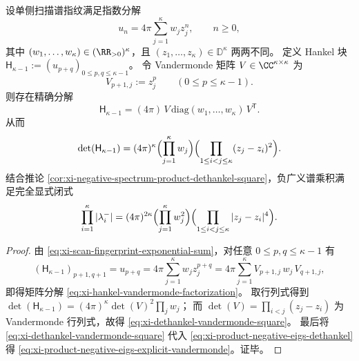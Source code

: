 \begin{theorem}\label{thm:xi-dethankel-vandermonde-square-finite-blaschke}
设单侧扫描谱指纹满足指数分解
\begin{equation}\label{eq:xi-scan-fingerprint-exponential-sum}
u_n=4\pi\sum_{j=1}^{\kappa} w_j z_j^{n},\qquad n\ge 0,
\end{equation}
其中 \((w_1,\dots,w_\kappa)\in(\RR_{>0})^\kappa\)，且 \((z_1,\dots,z_\kappa)\in\mathbb{D}^{\kappa}\) 两两不同。
定义 Hankel 块
\(
\mathsf H_{\kappa-1}:=(u_{p+q})_{0\le p,q\le \kappa-1}
\)。
令 Vandermonde 矩阵 \(V\in\CC^{\kappa\times\kappa}\) 为
\[
V_{p+1,j}:=z_j^{p}\qquad(0\le p\le \kappa-1).
\]
则存在精确分解
\begin{equation}\label{eq:xi-hankel-vandermonde-factorization}
\mathsf H_{\kappa-1}=(4\pi)\,V\,\mathrm{diag}(w_1,\dots,w_\kappa)\,V^{\mathsf T}.
\end{equation}
从而
\begin{equation}\label{eq:xi-dethankel-vandermonde-square}
\det(\mathsf H_{\kappa-1})
=(4\pi)^{\kappa}\Bigl(\prod_{j=1}^{\kappa}w_j\Bigr)\Bigl(\prod_{1\le i<j\le\kappa}(z_j-z_i)^2\Bigr).
\end{equation}
结合推论 \ref{cor:xi-negative-spectrum-product-dethankel-square}，负广义谱乘积满足完全显式闭式
\begin{equation}\label{eq:xi-product-negative-eigs-explicit-vandermonde}
\prod_{i=1}^{\kappa}|\lambda_i^-|
=(4\pi)^{2\kappa}
\Bigl(\prod_{j=1}^{\kappa}w_j^{2}\Bigr)
\Bigl(\prod_{1\le i<j\le\kappa}|z_j-z_i|^{4}\Bigr).
\end{equation}
\end{theorem}
\begin{proof}
由 \eqref{eq:xi-scan-fingerprint-exponential-sum}，对任意 \(0\le p,q\le \kappa-1\) 有
\[
(\mathsf H_{\kappa-1})_{p+1,q+1}
=u_{p+q}
=4\pi\sum_{j=1}^{\kappa}w_j z_j^{p+q}
=4\pi\sum_{j=1}^{\kappa}V_{p+1,j}\,w_j\,V_{q+1,j},
\]
即得矩阵分解 \eqref{eq:xi-hankel-vandermonde-factorization}。
取行列式得到
\(
\det(\mathsf H_{\kappa-1})=(4\pi)^\kappa\det(V)^2\prod_j w_j
\)；
而 \(\det(V)=\prod_{i<j}(z_j-z_i)\) 为 Vandermonde 行列式，故得 \eqref{eq:xi-dethankel-vandermonde-square}。
最后将 \eqref{eq:xi-dethankel-vandermonde-square} 代入 \eqref{eq:xi-product-negative-eigs-dethankel} 得 \eqref{eq:xi-product-negative-eigs-explicit-vandermonde}。证毕。
\end{proof}

